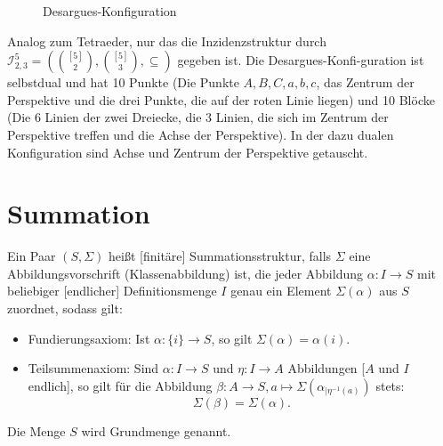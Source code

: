 \documentclass{article}
\begin{document}
\newpage

\begin{example}
  \begin{figure}
    \caption{Desargues-Konfiguration}
    \label{fig:Desargues}
  \end{figure}

  Analog zum Tetraeder, nur das die Inzidenzstruktur durch ${\mathcal{I}^5_{2, 3} = (\binom{[5]}{2}, \binom{[5]}{3}, \subseteq)}$ gegeben ist.
  Die Desargues-Konfi-guration ist selbstdual und hat 10 Punkte (Die Punkte $A, B, C, a, b, c$, das Zentrum der Perspektive und die drei Punkte, die auf der roten Linie liegen)
  und 10 Blöcke (Die 6 Linien der zwei Dreiecke, die 3 Linien, die sich im Zentrum der Perspektive treffen und die Achse der Perspektive).
  In der dazu dualen Konfiguration sind Achse und Zentrum der Perspektive getauscht.
\end{example}



\newpage

\section{Summation}

\begin{definition}
  Ein Paar $(S, \Sigma)$ heißt [finitäre] Summationsstruktur, falls $\Sigma$ eine Abbildungsvorschrift
  (Klassenabbildung) ist, die jeder Abbildung $\alpha \colon I \to S$ mit beliebiger [endlicher] Definitionsmenge $I$ 
  genau ein Element $\Sigma(\alpha)$ aus $S$ zuordnet, sodass gilt:
  \begin{itemize}
    \item Fundierungsaxiom: Ist $\alpha \colon \{ i \} \to S$, so gilt $\Sigma(\alpha) = \alpha(i)$.
    \item Teilsummenaxiom: Sind $\alpha \colon I \to S$ und $\eta \colon I \to A$ Abbildungen [$A$ und $I$ endlich],
          so gilt für die Abbildung $\beta \colon A \to S, a \mapsto \Sigma(\alpha_{\mid \eta^{-1}(a)})$
          stets: 
          \begin{equation*}
            \Sigma(\beta) = \Sigma(\alpha).
          \end{equation*}
  \end{itemize}
  Die Menge $S$ wird Grundmenge genannt.
\end{definition}
\end{document}
